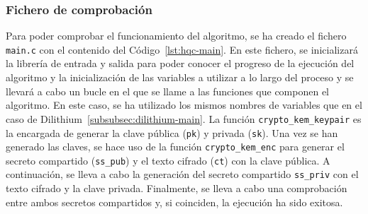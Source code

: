 \subsubsection{Fichero de comprobación}\label{subsubsec:hqc-main}

Para poder comprobar el funcionamiento del algoritmo, se ha creado el fichero \texttt{main.c} con el contenido del Código~\ref{lst:hqc-main}.
En este fichero, se inicializará la librería de entrada y salida para poder conocer el progreso de la ejecución del algoritmo y la inicialización de las variables a utilizar a lo largo del proceso y se llevará a cabo un bucle en el que se llame a las funciones que componen el algoritmo.
En este caso, se ha utilizado los mismos nombres de variables que en el caso de Dilithium~\ref{subsubsec:dilithium-main}.
La función \texttt{crypto\_kem\_keypair} es la encargada de generar la clave pública (\texttt{pk}) y privada (\texttt{sk}).
Una vez se han generado las claves, se hace uso de la función \texttt{crypto\_kem\_enc} para generar el secreto compartido (\texttt{ss\_pub}) y el texto cifrado (\texttt{ct}) con la clave pública.
A continuación, se lleva a cabo la generación del secreto compartido \texttt{ss\_priv} con el texto cifrado y la clave privada.
Finalmente, se lleva a cabo una comprobación entre ambos secretos compartidos y, si coinciden, la ejecución ha sido exitosa.

